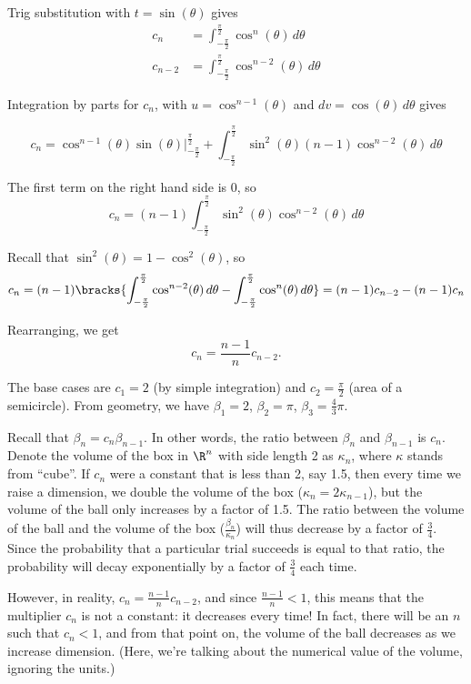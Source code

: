 \documentclass{article}
\begin{document}
Trig substitution with $t = \sin(\theta)$ gives
\begin{align*}
  c_n     & = \int_{-\frac{\pi}{2}}^{\frac{\pi}{2}} \cos^{n}(\theta) \, d\theta   \\
  c_{n-2} & = \int_{-\frac{\pi}{2}}^{\frac{\pi}{2}} \cos^{n-2}(\theta) \, d\theta
\end{align*}

Integration by parts for $c_n$, with $u = \cos^{n-1}(\theta)$ and $dv = \cos(\theta) \, d\theta$ gives

\[
  c_n = \cos^{n-1}(\theta) \sin(\theta) \bigg|_{-\frac{\pi}{2}}^{\frac{\pi}{2}} + \int_{-\frac{\pi}{2}}^{\frac{\pi}{2}} \sin^2(\theta) (n-1) \cos^{n-2}(\theta) \, d\theta
\]

The first term on the right hand side is 0, so
\[
  c_n = (n-1) \int_{-\frac{\pi}{2}}^{\frac{\pi}{2}} \sin^2(\theta) \cos^{n-2}(\theta) \, d\theta
\]

Recall that $\sin^2(\theta) = 1 - \cos^2(\theta)$, so
\[
  c_n = (n-1) \bracks{\int_{-\frac{\pi}{2}}^{\frac{\pi}{2}} \cos^{n-2}(\theta) \, d\theta - \int_{-\frac{\pi}{2}}^{\frac{\pi}{2}} \cos^n(\theta) \, d\theta} = (n-1) c_{n-2} - (n-1) c_n
\]

Rearranging, we get
\[
  c_n = \frac{n-1}{n}c_{n-2}.
\]

The base cases are $c_1 = 2$ (by simple integration) and $c_2 = \frac{\pi}{2}$ (area of a semicircle). From geometry, we have $\beta_1 = 2$, $\beta_2 = \pi$, $\beta_3 = \frac{4}{3}\pi$.

Recall that $\beta_n = c_n \beta_{n - 1}$. In other words, the ratio between $\beta_n$ and $\beta_{n - 1}$ is $c_n$. Denote the volume of the box in $\R^n$ with side length 2 as $\kappa_n$, where $\kappa$ stands from ``cube''. If $c_n$ were a constant that is less than 2, say 1.5, then every time we raise a dimension, we double the volume of the box ($\kappa_{n} = 2 \kappa_{n - 1}$), but the volume of the ball only increases by a factor of 1.5. The ratio between the volume of the ball and the volume of the box ($\frac{\beta_n}{\kappa_n}$) will thus decrease by a factor of $\frac{3}{4}$. Since the probability that a particular trial succeeds is equal to that ratio, the probability will decay exponentially by a factor of $\frac{3}{4}$ each time.

However, in reality, $c_n = \frac{n-1}{n}c_{n-2}$, and since $\frac{n-1}{n} < 1$, this means that the multiplier $c_n$ is not a constant: it decreases every time! In fact, there will be an $n$ such that $c_n < 1$, and from that point on, the volume of the ball decreases as we increase dimension. (Here, we're talking about the numerical value of the volume, ignoring the units.)
\end{document}
